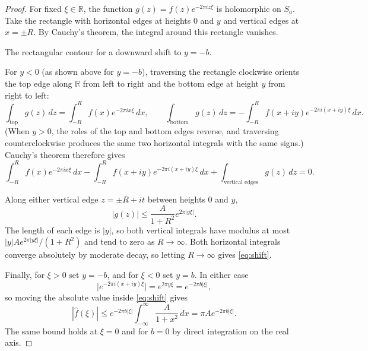\documentclass[11pt]{article}
\theoremstyle{plain}
\theoremstyle{definition}
\theoremstyle{boldremark}
\theoremstyle{remark}
\numberwithin{equation}{section}
\newcommand{\R}{\mathbb{R}}
\newenvironment{lecturefigure}
 {\par\addvspace{0.25em}\begingroup\setlength{\parskip}{0pt}\centering}
 {\par\endgroup\addvspace{0.25em}}
\begin{document}
\begin{proof}
For fixed $\xi\in\R$, the function $g(z)=f(z)e^{-2\pi i z\xi}$ is
holomorphic on $S_a$. Take the rectangle with horizontal edges at
heights $0$ and $y$ and vertical edges at $x=\pm R$. By Cauchy's theorem,
the integral around this rectangle vanishes.

\begin{lecturefigure}

{\small The rectangular contour for a downward shift to $y=-b$.}
\end{lecturefigure}

For $y<0$ (as shown above for $y=-b$), traversing the rectangle clockwise
orients the top edge along $\R$ from left to right and the bottom edge at
height $y$ from right to left:
\[
 \int_{\text{top}} g(z)\,dz
  = \int_{-R}^{R} f(x)e^{-2\pi ix\xi}\,dx,
 \qquad
 \int_{\text{bottom}} g(z)\,dz
  = -\int_{-R}^{R} f(x+iy)e^{-2\pi i(x+iy)\xi}\,dx.
\]
(When $y>0$, the roles of the top and bottom edges reverse, and traversing
counterclockwise produces the same two horizontal integrals with the same
signs.) Cauchy's theorem therefore gives
\[
 \int_{-R}^{R} f(x)e^{-2\pi ix\xi}\,dx
 - \int_{-R}^{R} f(x+iy)e^{-2\pi i(x+iy)\xi}\,dx
 + \int_{\text{vertical edges}} g(z)\,dz = 0.
\]

Along either vertical edge $z=\pm R+it$ between heights $0$ and $y$,
\[
 |g(z)|\leq\frac{A}{1+R^2}e^{2\pi|y\xi|}.
\]
The length of each edge is $|y|$, so both vertical integrals have modulus at
most $|y|A e^{2\pi|y\xi|}/(1+R^2)$ and tend to zero as $R\to\infty$. Both
horizontal integrals converge absolutely by moderate decay, so letting
$R\to\infty$ gives \eqref{eq:shift}.

Finally, for $\xi>0$ set $y=-b$, and for $\xi<0$ set $y=b$. In either case
\[
 \bigl|e^{-2\pi i(x+iy)\xi}\bigr| = e^{2\pi y\xi} = e^{-2\pi b|\xi|},
\]
so moving the absolute value inside \eqref{eq:shift} gives
\[
 |\widehat f(\xi)|
 \leq e^{-2\pi b|\xi|}\int_{-\infty}^{\infty}\frac{A}{1+x^2}\,dx
 = \pi A e^{-2\pi b|\xi|}.
\]
The same bound holds at $\xi=0$ and for $b=0$ by direct integration on the
real axis.
\end{proof}
\end{document}

